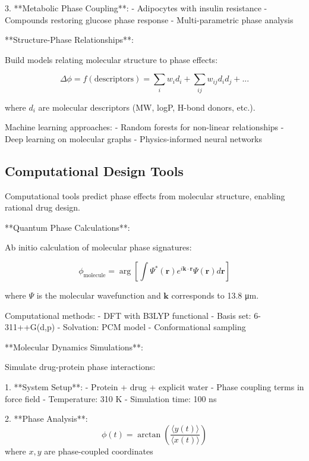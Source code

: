 \documentclass[12pt,a4paper]{report}
\begin{document}
3. **Metabolic Phase Coupling**:
   - Adipocytes with insulin resistance
   - Compounds restoring glucose phase response
   - Multi-parametric phase analysis

**Structure-Phase Relationships**:

Build models relating molecular structure to phase effects:

\begin{equation}
\Delta\phi = f(\text{descriptors}) = \sum_i w_i d_i + \sum_{ij} w_{ij} d_i d_j + ...
\end{equation}

where $d_i$ are molecular descriptors (MW, logP, H-bond donors, etc.).

Machine learning approaches:
- Random forests for non-linear relationships
- Deep learning on molecular graphs
- Physics-informed neural networks

\subsection{Computational Design Tools}

Computational tools predict phase effects from molecular structure, enabling rational drug design.

**Quantum Phase Calculations**:

Ab initio calculation of molecular phase signatures:

\begin{equation}
\phi_{\text{molecule}} = \arg\left[\int \Psi^*(\mathbf{r}) e^{i\mathbf{k} \cdot \mathbf{r}} \Psi(\mathbf{r}) d\mathbf{r}\right]
\end{equation}

where $\Psi$ is the molecular wavefunction and $\mathbf{k}$ corresponds to 13.8 μm.

Computational methods:
- DFT with B3LYP functional
- Basis set: 6-311++G(d,p)
- Solvation: PCM model
- Conformational sampling

**Molecular Dynamics Simulations**:

Simulate drug-protein phase interactions:

1. **System Setup**:
   - Protein + drug + explicit water
   - Phase coupling terms in force field
   - Temperature: 310 K
   - Simulation time: 100 ns

2. **Phase Analysis**:
   \begin{equation}
   \phi(t) = \arctan\left(\frac{\langle y(t) \rangle}{\langle x(t) \rangle}\right)
   \end{equation}
   where $x, y$ are phase-coupled coordinates
\end{document}
